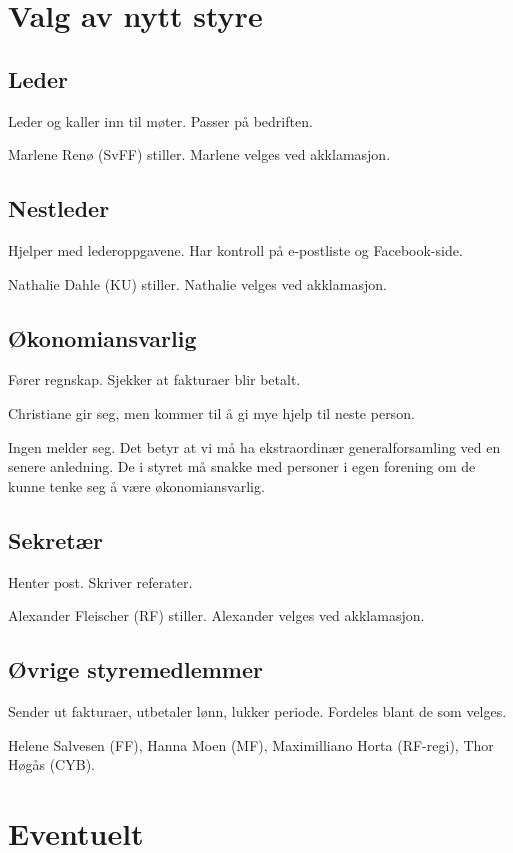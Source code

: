 \documentclass{article}[12pt]
\begin{document}
\section{Valg av nytt styre}
\subsection{Leder}
Leder og kaller inn til møter. Passer på bedriften.

Marlene Renø (SvFF) stiller. Marlene velges ved akklamasjon.

\subsection{Nestleder}
Hjelper med lederoppgavene. Har kontroll på e-postliste og Facebook-side.

Nathalie Dahle (KU) stiller. Nathalie velges ved akklamasjon.

\subsection{Økonomiansvarlig}
Fører regnskap. Sjekker at fakturaer blir betalt.

Christiane gir seg, men kommer til å gi mye hjelp til neste person.

Ingen melder seg. Det betyr at vi må ha ekstraordinær generalforsamling
ved en senere anledning. De i styret må snakke med personer i egen forening
om de kunne tenke seg å være økonomiansvarlig.

\subsection{Sekretær}
Henter post. Skriver referater.

Alexander Fleischer (RF) stiller. Alexander velges ved akklamasjon.

\subsection{Øvrige styremedlemmer}
Sender ut fakturaer, utbetaler lønn, lukker periode.
Fordeles blant de som velges.

Helene Salvesen (FF), Hanna Moen (MF), Maximilliano Horta (RF-regi),
Thor Høgås (CYB).

\section{Eventuelt}
\end{document}
